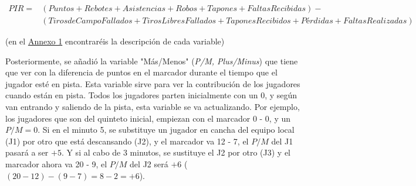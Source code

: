 \documentclass[paper=a4, fontsize=9pt]{article}
\begin{document}
\begin{equation} \label{eq1}
  \begin{split}
  PIR = & (Puntos + Rebotes + Asistencias + Robos + Tapones + Faltas Recibidas) - \\
  & (Tiros de Campo Fallados + Tiros Libres Fallados + Tapones Recibidos + Pérdidas + Faltas Realizadas)
  \end{split}
\end{equation}

\centerline{(en el \hyperref[sec:Annexo1]{Annexo 1} encontraréis la descripción de cada variable)}

\vspace{0.2cm}

Posteriormente, se añadió la variable "Más/Menos" (\emph{P/M, Plus/Minus}) que tiene que ver con la diferencia de puntos en el marcador durante el tiempo que el jugador esté en pista. Esta variable sirve para ver la contribución de los jugadores cuando están en pista. Todos los jugadores parten inicialmente con un 0, y según van entrando y saliendo de la pista, esta variable se va actualizando. Por ejemplo, los jugadores que son del quinteto inicial, empiezan con el marcador 0 - 0, y un $P/M = 0$. Si en el minuto 5, se substituye un jugador en cancha del equipo local (J1) por otro que está descansando (J2), y el marcador va 12 - 7, el $P/M$ del J1 pasará a ser $+5$. Y si al cabo de 3 minutos, se sustituye el J2 por otro (J3) y el marcador ahora va 20 - 9, el $P/M$ del J2 será $+6$ ($(20-12) - (9-7) = 8 - 2 = +6$).
\end{document}

